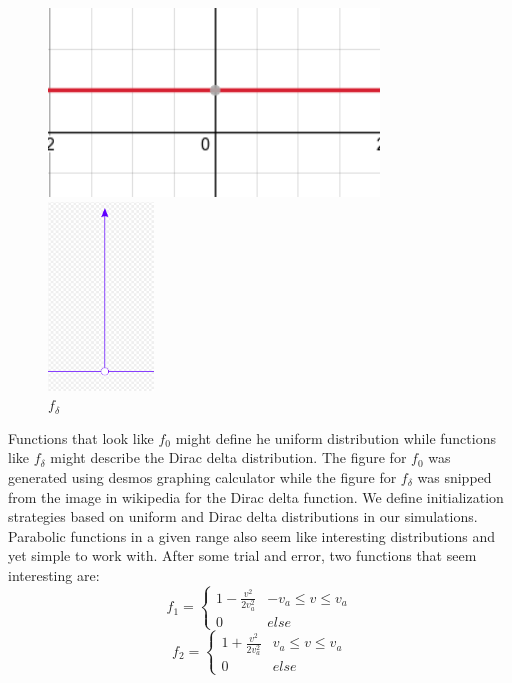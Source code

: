 \documentclass[12pt]{article}
\begin{document}
	\begin{figure}[H]
		\begin{multicols}{2}
			\includegraphics[width=\linewidth, height=5cm]{uniform.png} \caption{$f_{0}$} \par
			\includegraphics[width=\linewidth, height=5cm]{dirac.png} \caption{$f_{\delta}$} \par
		\end{multicols}
	\end{figure}
	Functions that look like $f_{0}$ might define he uniform distribution while functions like $f_{\delta}$ might describe the Dirac delta distribution. The figure for $f_{0}$ was generated using desmos graphing calculator while the figure for $f_{\delta}$ was snipped from the image in wikipedia for the Dirac delta function. We define initialization strategies based on uniform and Dirac delta distributions in our simulations.  \\
	
	\noindent Parabolic functions in a given range also seem like interesting distributions and yet simple to work with. After some trial and error, two functions that seem interesting are:
	\[ f_{1} = 
	\begin{cases} 
		1- \frac{v^{2}}{2 v_{a}^2} & -v_{a}\leq v\leq v_{a} \\
		0 & else 
	\end{cases}
	\]
	\[ f_{2} = 
	\begin{cases}
		1 + \frac{v^{2}}{2 v_{a}^2} & v_{a}\leq v\leq v_{a} \\
		0 & else
	\end{cases}\]  
	
\end{document}
